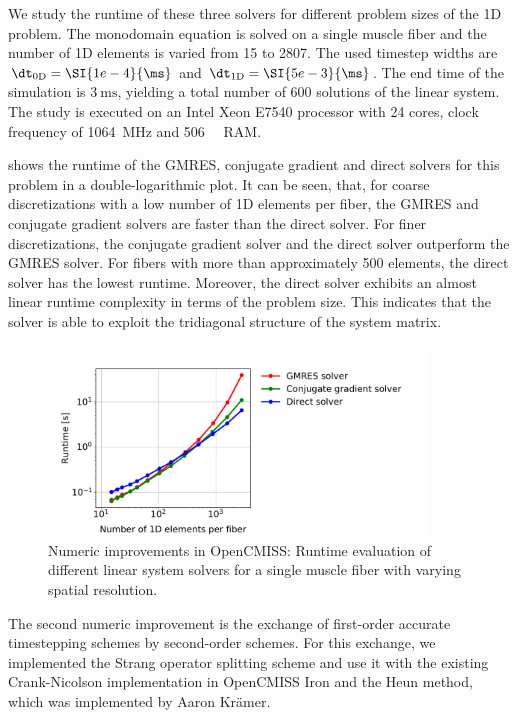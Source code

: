 We study the runtime of these three solvers for different problem sizes of the 1D problem. The monodomain equation is solved on a single muscle fiber and the number of 1D elements is varied from 15 to 2807. The used timestep widths are $\dt_\text{0D}=\SI{1e-4}{\ms}$ and $\dt_\text{1D}=\SI{5e-3}{\ms}$. The end time of the simulation is $\SI{3}{\ms}$, yielding a total number of 600 solutions of the linear system. The study is executed on an Intel Xeon E7540 processor with 24 cores, clock frequency of \SI{1064}{\mega\hertz} and \SI{506}{\gibi\byte} RAM.

 shows the runtime of the GMRES, conjugate gradient and direct solvers for this problem in a double-logarithmic plot.
It can be seen, that, for coarse discretizations with a low number of 1D elements per fiber, the GMRES and conjugate gradient solvers are faster than the direct solver. For finer discretizations, the conjugate gradient solver and the direct solver outperform the GMRES solver. For fibers with more than approximately 500 elements, the direct solver has the lowest runtime. Moreover, the direct solver exhibits an almost linear runtime complexity in terms of the problem size. This indicates that the solver is able to exploit the tridiagonal structure of the system matrix.

\begin{figure}
  \centering%
  \includegraphics[width=0.9\textwidth]{images/results/studies/opencmiss_linear_solvers.pdf}%
  \caption{Numeric improvements in OpenCMISS: Runtime evaluation of different linear system solvers for a single muscle fiber with varying spatial resolution.}%
  \label{fig:opencmiss_linear_solvers}%
\end{figure}%

The second numeric improvement is the exchange of first-order accurate timestepping schemes by second-order schemes. For this exchange, we implemented the Strang operator splitting scheme and use it with the existing Crank-Nicolson implementation in OpenCMISS Iron and the Heun method, which was  implemented by Aaron Krämer.

